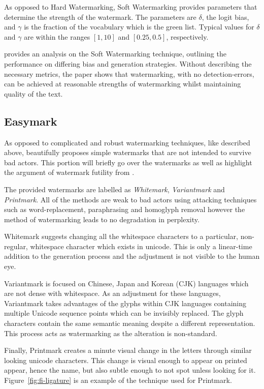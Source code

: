\documentclass{l4proj}
\theoremstyle{definition}
\begin{document}
        As opposed to Hard Watermarking, Soft Watermarking provides parameters that determine the strength of the watermark. The parameters are $\delta$, the logit bias, and $\gamma$ is the fraction of the vocabulary which is the green list. Typical values for $\delta$ and $\gamma$ are within the ranges $[1, 10]$ and $[0.25, 0.5]$, respectively.

        \citet{kirchenbauer2023watermark} provides an analysis on the Soft Watermarking technique, outlining the performance on differing bias and generation strategies. Without describing the necessary metrics, the paper shows that watermarking, with no detection-errors, can be achieved at reasonable strengths of watermarking whilst maintaining quality of the text.
        
    \subsection{Easymark}
        \label{sec:easymark}
        As opposed to complicated and robust watermarking techniques, like described above, \citet{sato2023embarrassingly} beautifully proposes simple watermarks that are not intended to survive bad actors. This portion will briefly go over the watermarks as well as highlight the argument of watermark futility from \citet{sato2023embarrassingly}.

        The provided watermarks are labelled as \emph{Whitemark}, \emph{Variantmark} and \emph{Printmark}. All of the methods are weak to bad actors using attacking techniques such as word-replacement, paraphrasing and homoglyph removal however the method of watermarking leads to no degradation in perplexity. 

        Whitemark suggests changing all the whitespace characters to a particular, non-regular, whitespace character which exists in unicode. This is only a linear-time addition to the generation process and the adjustment is not visible to the human eye.

        Variantmark is focused on Chinese, Japan and Korean (CJK) languages which are not dense with whitespace. As an adjustment for these languages, Variantmark takes advantages of the glyphs within CJK languages containing multiple Unicode sequence points which can be invisibly replaced. The glyph characters contain the same semantic meaning despite a different representation. This process acts as watermarking as the alteration is non-standard.

        Finally, Printmark creates a minute visual change in the letters through similar looking unicode characters. This change is visual enough to appear on printed appear, hence the name, but also subtle enough to not spot unless looking for it. Figure~\ref{fig:fi-ligature} is an example of the technique used for Printmark.
\end{document}
